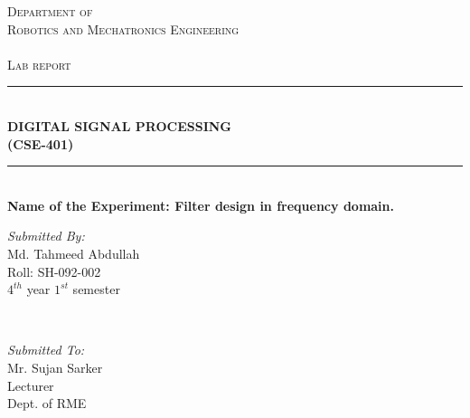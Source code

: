 \documentclass[a4paper,11pt]{article}
\begin{document}
	\begin{titlepage}
		
		\newcommand{\HRule}{\rule{\linewidth}{0.5mm}} %
		
		\center %
		
		
		
		\textsc{\LARGE Department of  }\\[0.3cm] %
		\textsc{\LARGE Robotics and Mechatronics Engineering  }\\[0.3cm]
		\textsc{\Large   }\\[0.3cm]
		\textsc{\Large Lab report }\\[0.5cm] %
		
		\HRule \\[0.4cm]
		{ \huge \bfseries DIGITAL SIGNAL PROCESSING}\\[0.4cm]  
		
		{ \huge \bfseries (CSE-401)}\\[0.03cm]
		
		\HRule 
		\\
		\large{\bfseries{Name of the Experiment:} Filter design in frequency domain.}
		\\[5cm]
		
		
		
		\begin{minipage}{0.4\textwidth}
			\begin{flushleft} \large
				\emph{Submitted By:}\\
				Md. Tahmeed Abdullah \\Roll: SH-092-002\\$4^{th}$ year $1^{st}$ semester %
			\end{flushleft}
		\end{minipage}
		~
		\begin{minipage}{0.4\textwidth}
			\begin{flushright} \large
				\emph{Submitted To:} \\
				Mr. Sujan Sarker\\Lecturer\\Dept. of RME %
			\end{flushright}
		\end{minipage}\\[1cm]
		
		
		
		\vfill
			
		
		
	\end{titlepage}
	\begin{center}
		
	\end{center}
\end{document}
